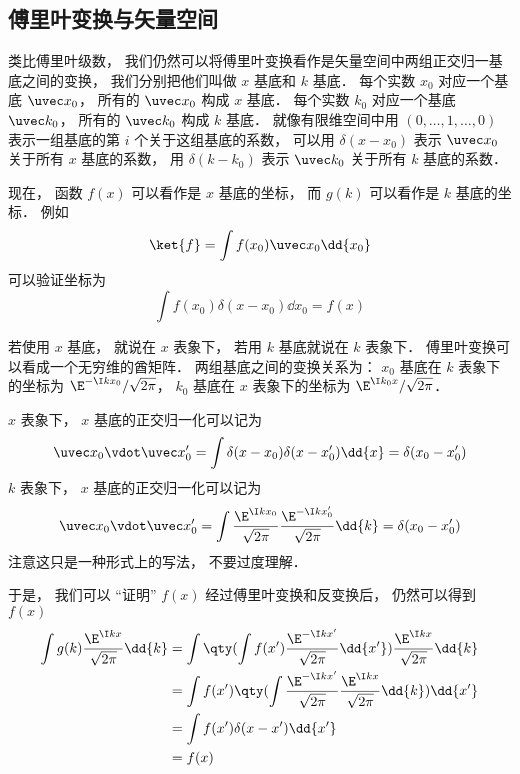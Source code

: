 

\subsection{傅里叶变换与矢量空间}
类比傅里叶级数， 我们仍然可以将傅里叶变换看作是矢量空间中两组正交归一基底之间的变换， 我们分别把他们叫做 $x$ 基底和 $k$ 基底． 每个实数 $x_0$ 对应一个基底 $\uvec x_0$， 所有的 $\uvec x_0$ 构成 $x$ 基底． 每个实数 $k_0$ 对应一个基底 $\uvec k_0$， 所有的 $\uvec k_0$ 构成 $k$ 基底． 就像有限维空间中用 $(0, \dots , 1, \dots , 0)$ 表示一组基底的第 $i$ 个关于这组基底的系数， 可以用 $\delta (x - x_0)$ 表示 $\uvec x_0$ 关于所有 $x$ 基底的系数， 用 $\delta (k - k_0)$ 表示 $\uvec k_0$ 关于所有 $k$ 基底的系数．

现在， 函数 $f(x)$ 可以看作是 $x$ 基底的坐标， 而 $g(k)$ 可以看作是 $k$ 基底的坐标． 例如
\begin{equation}
\ket{f} = \int f(x_0) \uvec x_0 \dd{x_0}
\end{equation}
可以验证坐标为
\begin{equation}
\int f(x_0) \delta (x - x_0) \dd{x_0} = f(x)
\end{equation}

若使用 $x$ 基底， 就说在 $x$ 表象下， 若用 $k$ 基底就说在 $k$ 表象下． 傅里叶变换可以看成一个无穷维的酋矩阵． 两组基底之间的变换关系为： $x_0$ 基底在 $k$ 表象下的坐标为 $\E^{-\I k x_0}/\sqrt{2\pi }$， $k_0$ 基底在 $x$ 表象下的坐标为 $\E^{\I k_0 x}/\sqrt{2\pi }$．

$x$ 表象下， $x$ 基底的正交归一化可以记为
\begin{equation}
\uvec x_0 \vdot \uvec x_0' = \int \delta (x - x_0) \delta (x - x_0') \dd{x} = \delta (x_0 - x_0')
\end{equation}
$k$ 表象下， $x$ 基底的正交归一化可以记为
\begin{equation}
\uvec x_0 \vdot \uvec x_0' = \int \frac{\E^{\I k x_0}}{\sqrt{2\pi }} \frac{\E^{-\I k x_0'}}{\sqrt{2\pi }} \dd{k} = \delta (x_0 - x_0')
\end{equation}
注意这只是一种形式上的写法， 不要过度理解．

于是， 我们可以 “证明” $f(x)$ 经过傅里叶变换和反变换后， 仍然可以得到 $f(x)$
\begin{equation}
\begin{aligned}
\int g(k) \frac{\E^{\I k x}}{\sqrt{2\pi }} \dd{k} &= \int \qty(\int f(x') \frac{\E^{-\I k x'}}{\sqrt{2\pi }} \dd{x'}) \frac{\E^{\I k x}}{\sqrt{2\pi }} \dd{k}\\
&= \int f(x') \qty(\int \frac{\E^{-\I k x'}}{\sqrt{2\pi }}\frac{\E^{\I k x}}{\sqrt{2\pi }}\dd{k}) \dd{x'}\\
&= \int f(x') \delta (x - x') \dd{x'}\\
&= f(x)
\end{aligned}
\end{equation}
